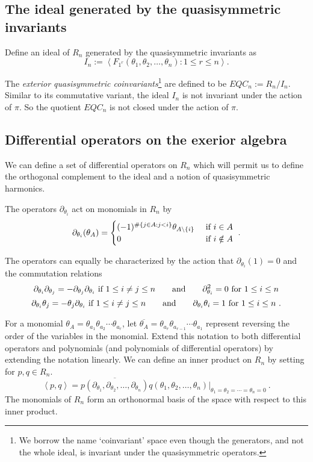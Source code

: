 \documentclass[submission]{FPSAC2023}
\theoremstyle{definition}
\numberwithin{equation}{section}
\begin{document}
\subsection{The ideal generated by the quasisymmetric invariants}

Define an ideal of $R_n$ generated by the quasisymmetric invariants as
\[
I_n := \left< F_{1^r}(\theta_1, \theta_2, \ldots, \theta_n) : 1 \leq r \leq n \right>.
\]


The \emph{exterior quasisymmetric coinvariants}\footnote{We borrow
the name `coinvariant' space even though the generators, and not the whole ideal, is invariant under the quasisymmetric operators.} are defined to be $EQC_n := R_n/I_n$. Similar to its commutative variant, the ideal $I_{n}$ is not invariant under the action of $\pi$. So the quotient $EQC_{n}$ is not closed under the action of $\pi$.


\subsection{Differential operators on the exerior algebra}\label{ssec:harm}
We can define a set of differential operators on $R_n$ which
will permit us to define the orthogonal complement to the
ideal and a notion of quasisymmetric harmonics.

The operators $\partial_{\theta_i}$ act on monomials in $R_n$
by
\[
\partial_{\theta_i}( \theta_A ) = \begin{cases}
(-1)^{\#\{ j \in A: j<i\}}\theta_{A \backslash \{i\}}&\hbox{ if }i \in A\\
0&\hbox{ if }i \notin A
\end{cases}~.
\]

The operators can equally be characterized by the action that $\partial_{\theta_i}(1) = 0$
and the commutation relations
\[
\partial_{\theta_i} \partial_{\theta_j}=-\partial_{\theta_j} \partial_{\theta_i}
\hbox{ if } 1 \leq i \neq j \leq n
\qquad\hbox{and}\qquad
\partial_{\theta_i}^2 = 0\hbox{ for }1 \leq i \leq n
\]
\[
\partial_{\theta_i} \theta_j=-\theta_j \partial_{\theta_i}
\hbox{ if } 1 \leq i \neq j \leq n
\qquad\hbox{and}\qquad
\partial_{\theta_i} \theta_i = 1\hbox{ for }1 \leq i \leq n~.
\]

For a monomial $\theta_A = \theta_{a_1} \theta_{a_2} \cdots \theta_{a_r}$,
let $\overline{\theta_A} = \theta_{a_r} \theta_{a_{r-1}} \cdots \theta_{a_1}$ represent
reversing the order of the variables in the monomial.  Extend this notation to both
differential operators and polynomials (and polynomials of differential operators)
by extending the notation linearly. 
We can define an inner product on $R_n$ by setting for $p,q \in R_n$.
\[
\left< p, q \right> = \overline{p(\partial_{\theta_1}, \partial_{\theta_2}, \ldots, \partial_{\theta_n})}
q( \theta_1, \theta_2, \ldots, \theta_n)|_{\theta_1=\theta_2 = \cdots=\theta_n=0}~.
\]
The monomials of $R_n$ form an orthonormal basis of the space with respect to this
inner product.
\end{document}
